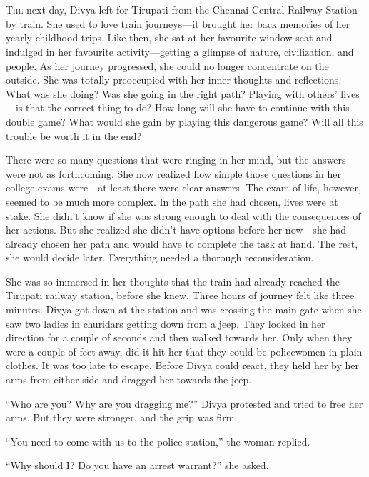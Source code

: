 \chapter{}

\lettrine{T}{he} next day, Divya left for Tirupati from the Chennai Central
Railway Station by train. She used to love train journeys—it brought her back
memories of her yearly childhood trips. Like then, she sat at her favourite
window seat and indulged in her favourite activity—getting a glimpse of nature,
civilization, and people. As her journey progressed, she could no longer concentrate
on the outside. She was totally preoccupied with her inner thoughts and reflections.
What was she doing?  Was she going in the right path? Playing with others'
lives—is that the correct thing to do? How long will she have to continue with
this double game? What would she gain by playing this dangerous game? Will all
this trouble be worth it in the end?

There were so many questions that were ringing in her mind, but the answers were
not as forthcoming. She now realized how simple those questions in her college
exams were—at least there were clear answers. The exam of life, however, seemed
to be much more complex. In the path she had chosen, lives were at stake. She
didn't know if she was strong enough to deal with the consequences of her
actions. But she realized she didn't have options before her now—she had already
chosen her path and would have to complete the task at hand. The rest, she would
decide later. Everything needed a thorough reconsideration.

She was so immersed in her thoughts that the train had already reached the
Tirupati railway station, before she knew. Three hours of journey felt like
three minutes. Divya got down at the station and was crossing the main gate when
she saw two ladies in churidars getting down from a jeep. They looked in her
direction for a couple of seconds and then walked towards her. Only when they
were a couple of feet away, did it hit her that they could be policewomen in
plain clothes. It was too late to escape.  Before Divya could react, they held
her by her arms from either side and dragged her towards the jeep.

“Who are you? Why are you dragging me?” Divya protested and tried to free her
arms. But they were stronger, and the grip was firm.

“You need to come with us to the police station,” the woman replied.

“Why should I? Do you have an arrest warrant?” she asked.

